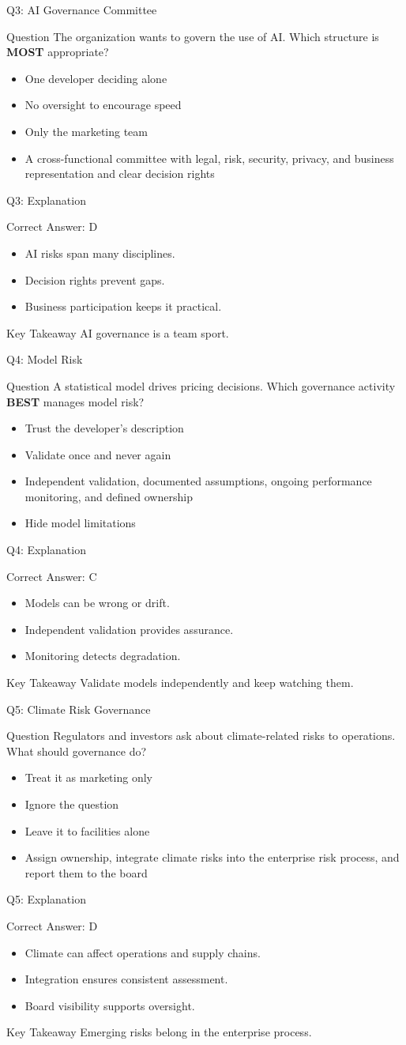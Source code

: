 \documentclass[aspectratio=169]{beamer}
\newcommand{\hq}[7]{%
	\begin{frame}{Q#1: #2}
		\begin{block}{Question}
			#3
		\end{block}
		\begin{itemize}
			#4
		\end{itemize}
	\end{frame}
	\begin{frame}{Q#1: Explanation}
		\begin{block}{Correct Answer: #5}
			\begin{itemize}
				#6
			\end{itemize}
		\end{block}
		\begin{alertblock}{Key Takeaway}
			#7
		\end{alertblock}
	\end{frame}
}
\begin{document}
	\hq{3}{AI Governance Committee}
	{The organization wants to govern the use of AI. Which structure is \textbf{MOST} appropriate?}
	{\item[\textbf{(A)}] One developer deciding alone
		\item[\textbf{(B)}] No oversight to encourage speed
		\item[\textbf{(C)}] Only the marketing team
		\item[\textbf{(D)}] A cross-functional committee with legal, risk, security, privacy, and business representation and clear decision rights}
	{D}
	{\item AI risks span many disciplines.
		\item Decision rights prevent gaps.
		\item Business participation keeps it practical.}
	{AI governance is a team sport.}

	\hq{4}{Model Risk}
	{A statistical model drives pricing decisions. Which governance activity \textbf{BEST} manages model risk?}
	{\item[\textbf{(A)}] Trust the developer's description
		\item[\textbf{(B)}] Validate once and never again
		\item[\textbf{(C)}] Independent validation, documented assumptions, ongoing performance monitoring, and defined ownership
		\item[\textbf{(D)}] Hide model limitations}
	{C}
	{\item Models can be wrong or drift.
		\item Independent validation provides assurance.
		\item Monitoring detects degradation.}
	{Validate models independently and keep watching them.}

	\hq{5}{Climate Risk Governance}
	{Regulators and investors ask about climate-related risks to operations. What should governance do?}
	{\item[\textbf{(A)}] Treat it as marketing only
		\item[\textbf{(B)}] Ignore the question
		\item[\textbf{(C)}] Leave it to facilities alone
		\item[\textbf{(D)}] Assign ownership, integrate climate risks into the enterprise risk process, and report them to the board}
	{D}
	{\item Climate can affect operations and supply chains.
		\item Integration ensures consistent assessment.
		\item Board visibility supports oversight.}
	{Emerging risks belong in the enterprise process.}
\end{document}
